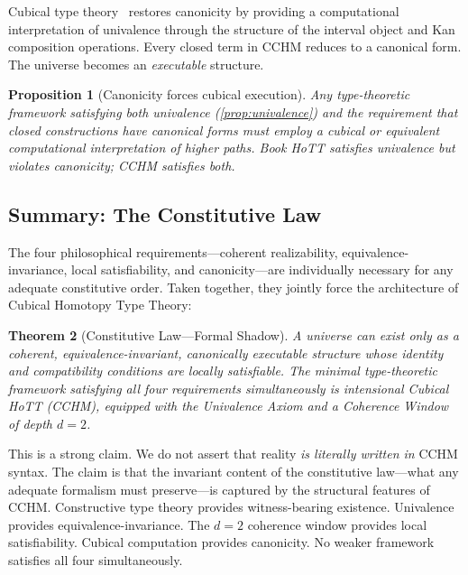 \documentclass[11pt,a4paper]{article}
\theoremstyle{plain}
\newtheorem{theorem}{Theorem}[section]
\newtheorem{proposition}[theorem]{Proposition}
\theoremstyle{definition}
\theoremstyle{remark}
\begin{document}
Cubical type theory~\cite{cchm2017} restores canonicity by providing a computational interpretation of univalence through the structure of the interval object and Kan composition operations.  Every closed term in CCHM reduces to a canonical form.  The universe becomes an \emph{executable} structure.

\begin{proposition}[Canonicity forces cubical execution]
\label{prop:cubical}
Any type-theoretic framework satisfying both univalence (\cref{prop:univalence}) and the requirement that closed constructions have canonical forms must employ a cubical or equivalent computational interpretation of higher paths.  Book HoTT satisfies univalence but violates canonicity; CCHM satisfies both.
\end{proposition}

\subsection{Summary: The Constitutive Law}

The four philosophical requirements---coherent realizability, equivalence-invariance, local satisfiability, and canonicity---are individually necessary for any adequate constitutive order.  Taken together, they jointly force the architecture of Cubical Homotopy Type Theory:

\begin{theorem}[Constitutive Law---Formal Shadow]
\label{thm:constitutive}
A universe can exist only as a coherent, equivalence-invariant, canonically executable structure whose identity and compatibility conditions are locally satisfiable.  The minimal type-theoretic framework satisfying all four requirements simultaneously is intensional Cubical HoTT (CCHM), equipped with the Univalence Axiom and a Coherence Window of depth $d = 2$.
\end{theorem}

This is a strong claim.  We do not assert that reality \emph{is literally written in} CCHM syntax.  The claim is that the invariant content of the constitutive law---what any adequate formalism must preserve---is captured by the structural features of CCHM.  Constructive type theory provides witness-bearing existence.  Univalence provides equivalence-invariance.  The $d = 2$ coherence window provides local satisfiability.  Cubical computation provides canonicity.  No weaker framework satisfies all four simultaneously.


\end{document}
